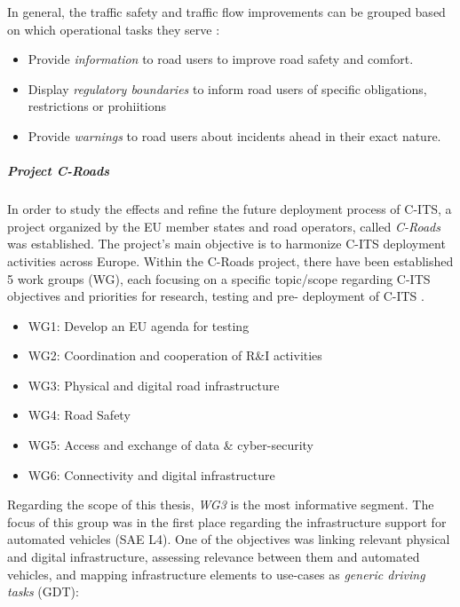 \documentclass[main.tex]{subfiles}
\begin{document}
In general, the traffic safety and traffic flow improvements can be grouped based on which 
operational tasks they serve \cite{CRoads2021}: 

\begin{itemize}
    \item Provide \emph{information} to road users to improve road safety and comfort.
    \item Display \emph{regulatory boundaries} to inform road users of specific obligations, 
    restrictions or prohiitions
    \item Provide \emph{warnings} to road users about incidents ahead in their exact nature. 
\end{itemize}

\subparagraph{Project C-Roads}

In order to study the effects and refine the future deployment process of C-ITS, a project 
organized by the EU member states and road operators, called \emph{C-Roads} was established. 
The project's main objective is to harmonize C-ITS deployment activities across Europe. 
Within the C-Roads project, there have been established 5 work groups (WG), each focusing on a 
specific topic/scope regarding C-ITS objectives and priorities for research, testing and pre-
deployment of C-ITS \cite{Commision2021}. 

\begin{itemize}
    \item WG1: Develop an EU agenda for testing
    \item WG2: Coordination and cooperation of R\&I activities
    \item WG3: Physical and digital road infrastructure
    \item WG4: Road Safety
    \item WG5: Access and exchange of data \& cyber-security
    \item WG6: Connectivity and digital infrastructure
\end{itemize}

Regarding the scope of this thesis, \emph{WG3} is the most informative segment. The focus of this group 
was in the first place regarding the infrastructure support for automated vehicles (SAE L4). One of 
the objectives was linking relevant physical and digital infrastructure, assessing relevance between 
them and automated vehicles, and mapping infrastructure elements to use-cases as \emph{generic driving 
tasks} (GDT):
\end{document}
